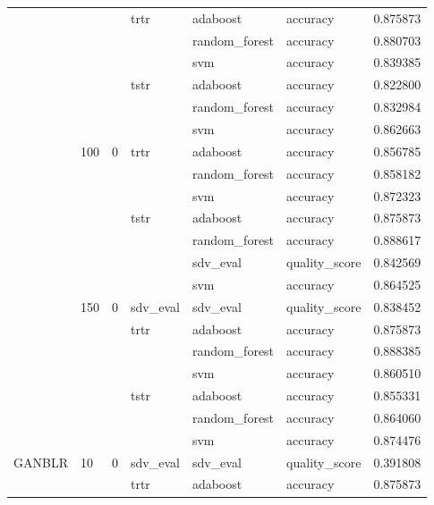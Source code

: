 \begin{longtable}{llllllr}
 &  &  & \multirow[t]{3}{*}{trtr} & adaboost & accuracy & 0.875873 \\
\cline{5-7}
 &  &  &  & random_forest & accuracy & 0.880703 \\
\cline{5-7}
 &  &  &  & svm & accuracy & 0.839385 \\
\cline{4-7} \cline{5-7}
 &  &  & \multirow[t]{3}{*}{tstr} & adaboost & accuracy & 0.822800 \\
\cline{5-7}
 &  &  &  & random_forest & accuracy & 0.832984 \\
\cline{5-7}
 &  &  &  & svm & accuracy & 0.862663 \\
\cline{2-7} \cline{3-7} \cline{4-7} \cline{5-7}
 & \multirow[t]{7}{*}{100} & \multirow[t]{7}{*}{0} & \multirow[t]{3}{*}{trtr} & adaboost & accuracy & 0.856785 \\
\cline{5-7}
 &  &  &  & random_forest & accuracy & 0.858182 \\
\cline{5-7}
 &  &  &  & svm & accuracy & 0.872323 \\
\cline{4-7} \cline{5-7}
 &  &  & \multirow[t]{4}{*}{tstr} & adaboost & accuracy & 0.875873 \\
\cline{5-7}
 &  &  &  & random_forest & accuracy & 0.888617 \\
\cline{5-7}
 &  &  &  & sdv_eval & quality_score & 0.842569 \\
\cline{5-7}
 &  &  &  & svm & accuracy & 0.864525 \\
\cline{2-7} \cline{3-7} \cline{4-7} \cline{5-7}
 & \multirow[t]{7}{*}{150} & \multirow[t]{7}{*}{0} & sdv_eval & sdv_eval & quality_score & 0.838452 \\
\cline{4-7} \cline{5-7}
 &  &  & \multirow[t]{3}{*}{trtr} & adaboost & accuracy & 0.875873 \\
\cline{5-7}
 &  &  &  & random_forest & accuracy & 0.888385 \\
\cline{5-7}
 &  &  &  & svm & accuracy & 0.860510 \\
\cline{4-7} \cline{5-7}
 &  &  & \multirow[t]{3}{*}{tstr} & adaboost & accuracy & 0.855331 \\
\cline{5-7}
 &  &  &  & random_forest & accuracy & 0.864060 \\
\cline{5-7}
 &  &  &  & svm & accuracy & 0.874476 \\
\cline{1-7} \cline{2-7} \cline{3-7} \cline{4-7} \cline{5-7}
\multirow[t]{70}{*}{GANBLR} & \multirow[t]{14}{*}{10} & \multirow[t]{7}{*}{0} & sdv_eval & sdv_eval & quality_score & 0.391808 \\
\cline{4-7} \cline{5-7}
 &  &  & \multirow[t]{3}{*}{trtr} & adaboost & accuracy & 0.875873 \\

\end{longtable}
